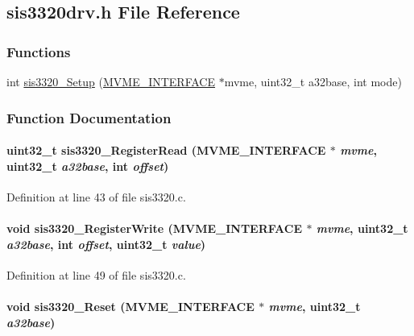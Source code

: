 \subsection{sis3320drv.h File Reference}
\label{sis3320drv_8h}
\subsubsection*{Functions}
\begin{DoxyCompactItemize}
\item 
int \hyperlink{sis3320drv_8h_ae1163990f782e9844b925f28255c588e}{sis3320\_\-Setup} (\hyperlink{structMVME__INTERFACE}{MVME\_\-INTERFACE} $\ast$mvme, uint32\_\-t a32base, int mode)
\end{DoxyCompactItemize}


\subsubsection{Function Documentation}
\paragraph[{sis3320\_\-RegisterRead}]{\setlength{\rightskip}{0pt plus 5cm}uint32\_\-t sis3320\_\-RegisterRead ({\bf MVME\_\-INTERFACE} $\ast$ {\em mvme}, \/  uint32\_\-t {\em a32base}, \/  int {\em offset})}\hfill\label{sis3320drv_8h_addb17b85efa458df51fb8aed4ef3d432}


Definition at line 43 of file sis3320.c.
\paragraph[{sis3320\_\-RegisterWrite}]{\setlength{\rightskip}{0pt plus 5cm}void sis3320\_\-RegisterWrite ({\bf MVME\_\-INTERFACE} $\ast$ {\em mvme}, \/  uint32\_\-t {\em a32base}, \/  int {\em offset}, \/  uint32\_\-t {\em value})}\hfill\label{sis3320drv_8h_a175d9223ac5afb63352b31a4a6a2ab20}


Definition at line 49 of file sis3320.c.
\paragraph[{sis3320\_\-Reset}]{\setlength{\rightskip}{0pt plus 5cm}void sis3320\_\-Reset ({\bf MVME\_\-INTERFACE} $\ast$ {\em mvme}, \/  uint32\_\-t {\em a32base})}\hfill\label{sis3320drv_8h_a16d75653195aa5388e06e325b3b34621}


